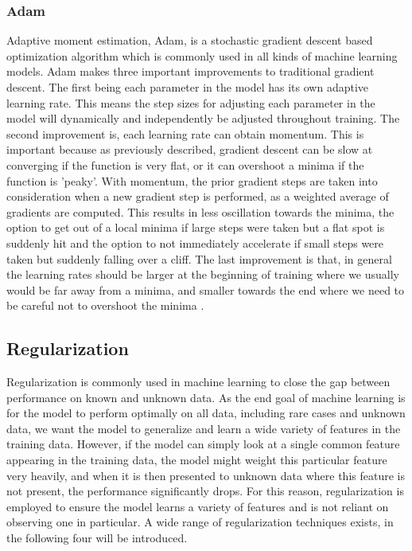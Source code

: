 \subsubsection{Adam}
Adaptive moment estimation, Adam, is a stochastic gradient descent based optimization algorithm which is commonly used in all kinds of machine learning models. Adam makes three important improvements to traditional gradient descent. The first being each parameter in the model has its own adaptive learning rate. This means the step sizes for adjusting each parameter in the model will dynamically and independently be adjusted throughout training. The second improvement is, each learning rate can obtain momentum. This is important because as previously described, gradient descent can be slow at converging if the function is very flat, or it can overshoot a minima if the function is 'peaky'. With momentum, the prior gradient steps are taken into consideration when a new gradient step is performed, as a weighted average of gradients are computed. This results in less oscillation towards the minima, the option to get out of a local minima if large steps were taken but a flat spot is suddenly hit and the option to not immediately accelerate if small steps were taken but suddenly falling over a cliff. The last improvement is that, in general the learning rates should be larger at the beginning of training where we usually would be far away from a minima, and smaller towards the end where we need to be careful not to overshoot the minima \cite{adam}.

\subsection{Regularization}
Regularization is commonly used in machine learning to close the gap between performance on known and unknown data. As the end goal of machine learning is for the model to perform optimally on all data, including rare cases and unknown data, we want the model to generalize and learn a wide variety of features in the training data. However, if the model can simply look at a single common feature appearing in the training data, the model might weight this particular feature very heavily, and when it is then presented to unknown data where this feature is not present, the performance significantly drops. For this reason, regularization is employed to ensure the model learns a variety of features and is not reliant on observing one in particular. A wide range of regularization techniques exists, in the following four will be introduced. 

